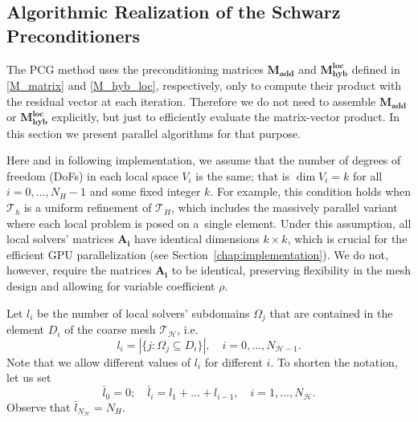 \documentclass[11pt]{article}
\theoremstyle{definition}
\theoremstyle{theorem}
\begin{document}
\subsection{Algorithmic Realization of the Schwarz Preconditioners}
\label{sec:preconditioner-alg}

The PCG method uses the preconditioning matrices $\bm{M_{add}}$ and $\bm{M_{hyb}^{loc}}$
defined in \eqref{M_matrix} and \eqref{M_hyb_loc}, respectively,
only to compute their product with the residual vector at each iteration.
Therefore we do not need to assemble $\bm{M_{add}}$ or $\bm{M_{hyb}^{loc}}$
explicitly, but just to efficiently evaluate the matrix\nobreakdash-vector product.
In this section we present parallel algorithms for that purpose.

Here and in following implementation, we assume that the number of degrees of freedom
(DoFs) in each local space $V_i$ is the same; that is $\dim V_i = k$ for
all $i=0,...,N_H-1$ and some fixed integer $k$.
For example, this condition holds
when $\mathcal{T}_h$ is a uniform refinement of $\mathcal{T}_H$,
which includes the massively parallel variant where each local problem is posed on
a~single element. Under this assumption, all local solvers' matrices
$\bm{A_i}$ have identical dimensions $k\times k$, which is crucial for the
efficient GPU parallelization (see Section~\ref{chap:implementation}). We do not,
however, require the matrices $\bm{A_i}$ to be identical, preserving flexibility
in the mesh design and allowing for variable coefficient $\rho$.

Let $l_i$ be the number of local solvers' subdomains $\Omega_j$ that
are contained in the element $D_i$ of the coarse mesh $\mathcal{T}_{\mathcal{H}}$, i.e.
\begin{equation}
  l_i = \left|\{j : \Omega_j \subseteq D_i\}\right|,\quad i=0,...,N_{\mathcal{H}-1}.\label{l_i_def}
\end{equation}
Note that we allow different values of $l_i$ for different $i$. To shorten the notation,
let us set
\begin{equation}
  \bar l_0 = 0;\quad \bar l_i = l_1 + ... + l_{i-1},\quad i=1,...,N_{\mathcal{H}}.\label{bar_l_i_def}
\end{equation}
Observe that $\bar l_{N_{\mathcal{H}}} = N_H$.
\end{document}
